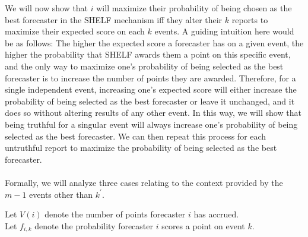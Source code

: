 \documentclass[letterpaper,12pt]{article}
\newcommand{\1}{\mathbbm{1}}
\begin{document}
We will now show that $i$ will maximize their probability of being chosen as the best forecaster in the SHELF mechanism iff they alter their $k$ reports to maximize their expected score on each $k$ events. A guiding intuition here would be as follows: The higher the expected score a forecaster has on a given event, the higher the probability that SHELF awards them a point on this specific event, and the only way to maximize one's probability of being selected as the best forecaster is to increase the number of points they are awarded. Therefore, for a single independent event, increasing one's expected score will either increase the probability of being selected as the best forecaster or leave it unchanged, and it does so without altering results of any other event. In this way, we will show that being truthful for a singular event will always increase one's probability of being selected as the best forecaster. We can then repeat this process for each untruthful report to maximize the probability of being selected as the best forecaster.\\\\
Formally, we will analyze three cases relating to the context provided by the $m - 1$ events other than $k^\prime$.

Let $V(i)$ denote the number of points forecaster $i$ has accrued.\\
Let $f_{i,k}$ denote the probability forecaster $i$ scores a point on event $k$.\\
\end{document}
